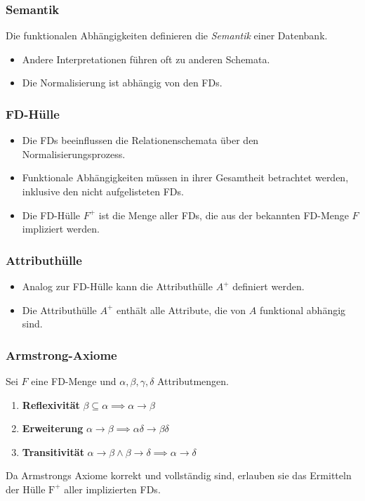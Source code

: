 			\subsubsection{Semantik} %
				Die funktionalen Abhängigkeiten definieren die \textit{Semantik} einer Datenbank.
				\begin{itemize}
					\item Andere Interpretationen führen oft zu anderen Schemata.
					\item Die Normalisierung ist abhängig von den FDs.
				\end{itemize}

			\subsubsection{FD-Hülle} %
				\begin{itemize}
					\item Die FDs beeinflussen die Relationenschemata über den Normalisierungsprozess.
					\item Funktionale Abhängigkeiten müssen in ihrer Gesamtheit betrachtet werden, inklusive den nicht aufgelisteten FDs.
					\item Die FD-Hülle \(F^+\) ist die Menge aller FDs, die aus der bekannten FD-Menge \(F\) impliziert werden.
				\end{itemize}

			\subsubsection{Attributhülle} %
				\begin{itemize}
					\item Analog zur FD-Hülle kann die Attributhülle \(A^+\) definiert werden.
					\item Die Attributhülle \(A^+\) enthält alle Attribute, die von \(A\) funktional abhängig sind.
				\end{itemize}

			\subsubsection{Armstrong-Axiome} %
				Sei \( F \) eine FD-Menge und \( \alpha, \beta, \gamma, \delta \) Attributmengen.
				\begin{enumerate}
					\item \textbf{Reflexivität} \( \beta \subseteq \alpha \implies \alpha \rightarrow \beta \)
					\item \textbf{Erweiterung} \( \alpha \rightarrow \beta \implies \alpha\delta \rightarrow \beta\delta \)
					\item \textbf{Transitivität} \( \alpha \rightarrow \beta \land \beta \rightarrow \delta \implies \alpha \rightarrow \delta \)
				\end{enumerate}
				Da Armstrongs Axiome korrekt und vollständig sind, erlauben sie das Ermitteln der Hülle \(\text{F}^+\) aller implizierten FDs.

